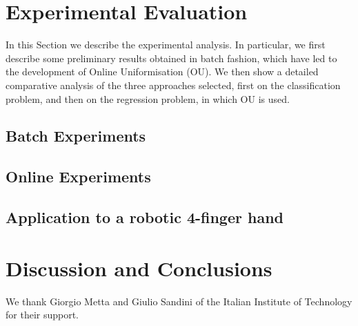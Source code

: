 \documentclass[twocolumn,fleqn,natbib]{svjour2}
\begin{document}
\section{Experimental Evaluation}
\label{sec:exp}

In this Section we describe the experimental analysis. In particular,
we first describe some preliminary results obtained in batch fashion,
which have led to the development of Online Uniformisation (OU). We
then show a detailed comparative analysis of the three approaches
selected, first on the classification problem, and then on the
regression problem, in which OU is used.

\subsection{Batch Experiments}
\label{subsec:strategy}


\subsection{Online Experiments}
\label{subsec:online}


\subsection{Application to a robotic 4-finger hand}
\label{subsec:application}


\section{Discussion and Conclusions}
\label{sec:discussion}


\begin{acknowledgements}
  We thank Giorgio Metta and Giulio Sandini of the
  Italian Institute of Technology for their support.
\end{acknowledgements}

{\small


}
\end{document}
